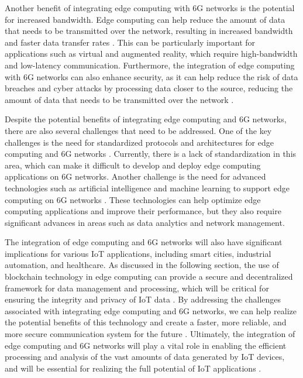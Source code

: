 \documentclass[11pt]{article}
\begin{document}
Another benefit of integrating edge computing with 6G networks is the potential for increased bandwidth. Edge computing can help reduce the amount of data that needs to be transmitted over the network, resulting in increased bandwidth and faster data transfer rates \cite{ref141}. This can be particularly important for applications such as virtual and augmented reality, which require high-bandwidth and low-latency communication. Furthermore, the integration of edge computing with 6G networks can also enhance security, as it can help reduce the risk of data breaches and cyber attacks by processing data closer to the source, reducing the amount of data that needs to be transmitted over the network \cite{ref142}.

Despite the potential benefits of integrating edge computing and 6G networks, there are also several challenges that need to be addressed. One of the key challenges is the need for standardized protocols and architectures for edge computing and 6G networks \cite{ref143}. Currently, there is a lack of standardization in this area, which can make it difficult to develop and deploy edge computing applications on 6G networks. Another challenge is the need for advanced technologies such as artificial intelligence and machine learning to support edge computing on 6G networks \cite{ref144}. These technologies can help optimize edge computing applications and improve their performance, but they also require significant advances in areas such as data analytics and network management.

The integration of edge computing and 6G networks will also have significant implications for various IoT applications, including smart cities, industrial automation, and healthcare. As discussed in the following section, the use of blockchain technology in edge computing can provide a secure and decentralized framework for data management and processing, which will be critical for ensuring the integrity and privacy of IoT data \cite{ref137}. By addressing the challenges associated with integrating edge computing and 6G networks, we can help realize the potential benefits of this technology and create a faster, more reliable, and more secure communication system for the future \cite{ref145}. Ultimately, the integration of edge computing and 6G networks will play a vital role in enabling the efficient processing and analysis of the vast amounts of data generated by IoT devices, and will be essential for realizing the full potential of IoT applications \cite{ref2}.
\end{document}
